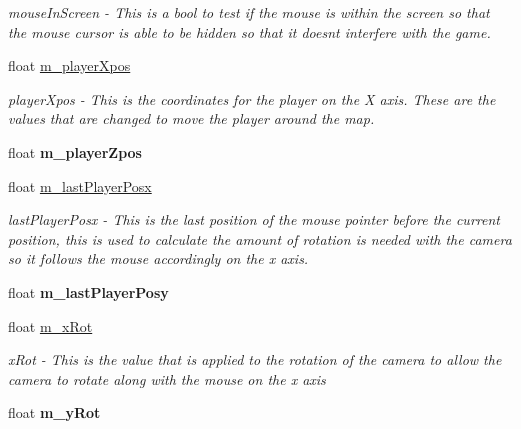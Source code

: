 \begin{DoxyCompactItemize}
\begin{DoxyCompactList}\small\item\em mouseInScreen -\/ This is a bool to test if the mouse is within the screen so that the mouse cursor is able to be hidden so that it doesnt interfere with the game. \item\end{DoxyCompactList}\item 
float \hyperlink{classCamera_adb4519feec6a1363662305b67a2cc486}{m\_\-playerXpos}
\begin{DoxyCompactList}\small\item\em playerXpos -\/ This is the coordinates for the player on the X axis. These are the values that are changed to move the player around the map. \item\end{DoxyCompactList}\item 
\hypertarget{classCamera_a97f005c317a5d52deb6acd91820ebc0d}{
float {\bfseries m\_\-playerZpos}}
\label{classCamera_a97f005c317a5d52deb6acd91820ebc0d}

\item 
float \hyperlink{classCamera_a96dd9f9e56923783d8be6bb3b42456cf}{m\_\-lastPlayerPosx}
\begin{DoxyCompactList}\small\item\em lastPlayerPosx -\/ This is the last position of the mouse pointer before the current position, this is used to calculate the amount of rotation is needed with the camera so it follows the mouse accordingly on the x axis. \item\end{DoxyCompactList}\item 
\hypertarget{classCamera_a00cbd8cc9cf35c7dea43c60e30e1d05a}{
float {\bfseries m\_\-lastPlayerPosy}}
\label{classCamera_a00cbd8cc9cf35c7dea43c60e30e1d05a}

\item 
float \hyperlink{classCamera_ab2c726172275816059ddb628f9a20de4}{m\_\-xRot}
\begin{DoxyCompactList}\small\item\em xRot -\/ This is the value that is applied to the rotation of the camera to allow the camera to rotate along with the mouse on the x axis \item\end{DoxyCompactList}\item 
\hypertarget{classCamera_a6f617b54e011de68a49ca92ba9d7a45e}{
float {\bfseries m\_\-yRot}}
\label{classCamera_a6f617b54e011de68a49ca92ba9d7a45e}


\end{DoxyCompactItemize}
